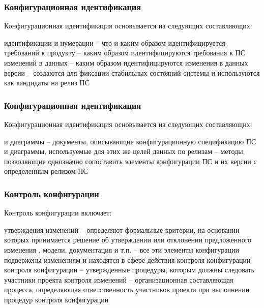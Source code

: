 \documentclass{../industrial-development}
\begin{document}
\lecturenotes

\begin{frame} \frametitle{Конфигурационная идентификация}
  \begin{block}{Конфигурационная идентификация основывается на следующих составляющих:}
  \begin{itemize}
 идентификации и нумерации – что и каким образом идентифицируется
 требований к продукту – каким образом идентифицируются требования к ПС
 изменений в данных – каким образом идентифицируются изменения в данных
 версии – создаются для фиксации стабильных состояний системы и используются как кандидаты на релиз ПС
  \end{itemize}
	\end{block}
\end{frame}

\begin{frame} \frametitle{Конфигурационная идентификация}
  \begin{block}{Конфигурационная идентификация основывается на следующих составляющих:}
  \begin{itemize}
 и диаграммы – документы, описывающие конфигурационную спецификацию ПС и диаграммы, используемые для этих же целей
 данных по релизам – методы, позволяющие однозначно сопоставить элементы конфигурации ПС и их версии с определенным релизом ПС
  \end{itemize}
	\end{block}
\end{frame}

\lecturenotes

\begin{frame} \frametitle{Контроль конфигурации}
  \begin{block}{Контроль конфигурации включает:}
  \begin{itemize}
 утверждения изменений – определяют формальные критерии, на основании которых принимается решение об утверждении или отклонении предложенного изменения
, модели, документация и т.п. – все эти элементы конфигурации подвержены изменениям и находятся в сфере действия контроля конфигурации
 контроля конфигурации – утвержденные процедуры, которым должны следовать участники проекта
 контроля изменений – организационная составляющая процесса, определяющая ответственность участников проекта при выполнении процедур контроля конфигурации
  \end{itemize}
	\end{block}
\end{frame}
\end{document}
